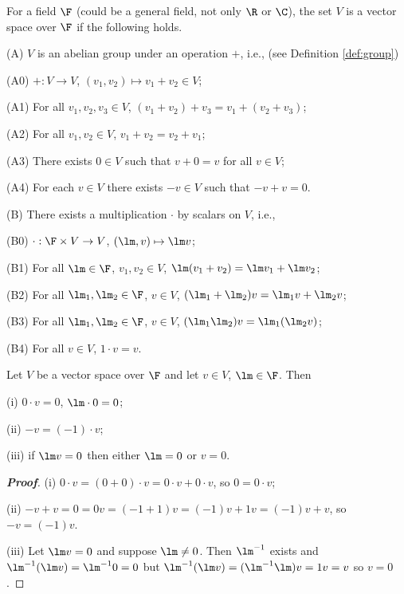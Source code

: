 \begin{definition}\label{def:vector_space}
For a field $\F$ (could be a general field, not only $\R$ or $\C$), the set $V$ is a vector space over $\F$ if the following holds.
\ben
\item [(A)] $V$ is an abelian group under an operation $+$, i.e., (see Definition \ref{def:group})
\ben
\item [(A0)] $+ : V \to V$, $(v_1, v_2) \mapsto v_1 + v_2 \in V$;
\item [(A1)] For all $v_1, v_2, v_3 \in V$, $(v_1 + v_2) + v_3 = v_1 + (v_2 + v_3)$;
\item [(A2)] For all $v_1, v_2 \in V$, $v_1 + v_2 = v_2 + v_1$;
\item [(A3)] There exists $0 \in V$ such that $v + 0 = v$ for all $v \in V$;
\item [(A4)] For each $v \in V$ there exists $-v \in V$ such that $-v + v = 0$.
\een
\item [(B)] There exists a multiplication $\cdot$ by scalars on $V$, i.e.,
\ben
\item [(B0)] $\cdot: \F \times V \to V$, $(\lm, v) \mapsto \lm v$;
\item [(B1)] For all $\lm \in \F$, $v_1, v_2 \in V$, $\lm(v_1 + v_2) = \lm v_1 + \lm v_2$;
\item [(B2)] For all $\lm_1, \lm_2 \in\F$, $v \in V$, $(\lm_1 + \lm_2)v = \lm_1v + \lm_2v$;
\item [(B3)] For all $\lm_1, \lm_2 \in\F$, $v \in V$, $(\lm_1\lm_2)v = \lm_1(\lm_2v)$;
\item [(B4)] For all $v \in V$, $1\cdot v = v$.
\een
\een
\end{definition}

\begin{lemma}
Let $V$ be a vector space over $\F$ and let $v \in V$, $\lm \in \F$. Then
\ben
\item [(i)] $0 \cdot v = 0$, $\lm \cdot 0 = 0$;
\item [(ii)] $-v = (-1) \cdot v$;
\item [(iii)] if $\lm v = 0$ then either $\lm = 0$ or $v = 0$.
\een
\end{lemma}

\begin{proof}[\bf Proof]
\ben
\item [(i)] $0 \cdot v = (0 + 0) \cdot v = 0 \cdot v + 0 \cdot v$, so $0 = 0 \cdot v$;
\item [(ii)] $-v + v = 0 = 0v = (-1 + 1)v = (-1)v + 1v = (-1)v + v$, so $-v = (-1)v$.
\item [(iii)] Let $\lm v = 0$ and suppose $\lm \neq 0$. Then $\lm^{-1}$ exists and $\lm^{-1}(\lm v) = \lm^{-1} 0 = 0$ but $\lm^{-1}(\lm v) = (\lm^{-1}\lm)v = 1v = v$ so $v = 0$.
\een
\end{proof}

